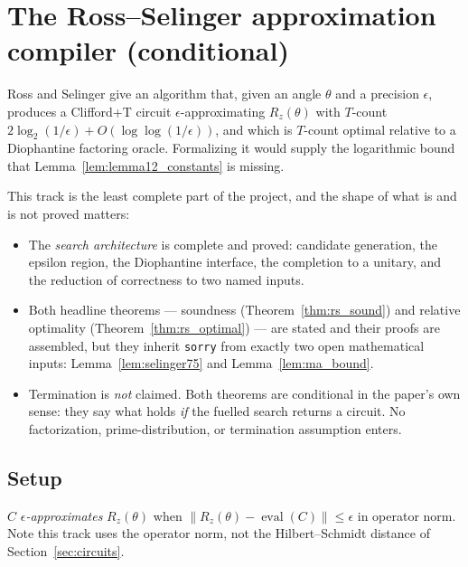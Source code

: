 \section{The Ross--Selinger approximation compiler (conditional)}
\label{sec:ross_selinger}

Ross and Selinger give an algorithm that, given an angle $\theta$ and a
precision $\epsilon$, produces a Clifford+T circuit $\epsilon$-approximating
$R_z(\theta)$ with $T$-count $2\log_2(1/\epsilon) + O(\log\log(1/\epsilon))$,
and which is $T$-count optimal relative to a Diophantine factoring oracle.
Formalizing it would supply the logarithmic bound that
Lemma~\ref{lem:lemma12_constants} is missing.

This track is the least complete part of the project, and the shape of what is
and is not proved matters:

\begin{itemize}
  \item The \emph{search architecture} is complete and proved: candidate
    generation, the epsilon region, the Diophantine interface, the completion
    to a unitary, and the reduction of correctness to two named inputs.
  \item Both headline theorems --- soundness
    (Theorem~\ref{thm:rs_sound}) and relative optimality
    (Theorem~\ref{thm:rs_optimal}) --- are stated and their proofs are
    assembled, but they inherit \texttt{sorry} from exactly two open
    mathematical inputs: Lemma~\ref{lem:selinger75} and
    Lemma~\ref{lem:ma_bound}.
  \item Termination is \emph{not} claimed.  Both theorems are conditional in
    the paper's own sense: they say what holds \emph{if} the fuelled search
    returns a circuit.  No factorization, prime-distribution, or termination
    assumption enters.
\end{itemize}

\subsection{Setup}

\begin{definition}
  \label{def:rs_approx}
  \leanok
  $C$ \emph{$\epsilon$-approximates} $R_z(\theta)$ when
  $\lVert R_z(\theta) - \operatorname{eval}(C)\rVert \le \epsilon$ in operator
  norm.  Note this track uses the operator norm, not the Hilbert--Schmidt
  distance of Section~\ref{sec:circuits}.
\end{definition}

